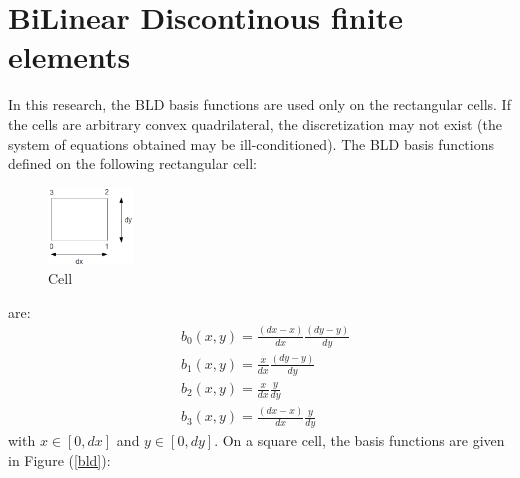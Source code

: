\section{BiLinear Discontinous finite elements}
In this research, the BLD basis functions are used only on the rectangular
cells. If the cells are arbitrary convex quadrilateral, the discretization may
not exist (the system of equations obtained may be ill-conditioned). The BLD basis 
functions defined on the following rectangular cell:
\begin{figure}[H]
  \centering
  \includegraphics[width=0.2\textwidth]{./Spatial_discretizations/cell}
  \caption{Cell}
\end{figure}
are:
\begin{align}
  &b_0(x,y) = \frac{(dx-x)}{dx}\frac{(dy-y)}{dy}\\
  &b_1(x,y) = \frac{x}{dx}\frac{(dy-y)}{dy}\\
  &b_2(x,y) = \frac{x}{dx}\frac{y}{dy}\\
  &b_3(x,y) = \frac{(dx-x)}{dx}\frac{y}{dy}
\end{align}
with $x\in[0,dx]$ and $y\in[0,dy]$. On a square cell, the basis functions are
given in Figure (\ref{bld}):
